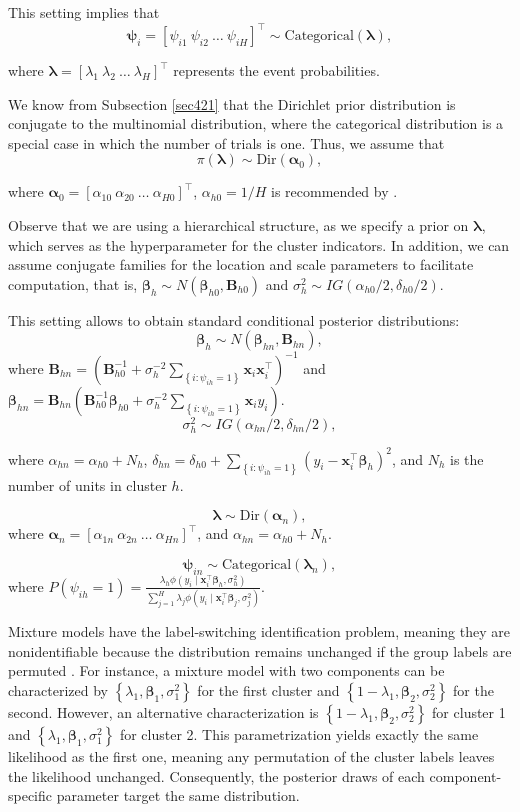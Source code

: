This setting implies that  
\[
\bm{\psi}_i = [\psi_{i1} \  \psi_{i2} \ \dots \ \psi_{iH}]^{\top} \sim \text{Categorical}(\bm{\lambda}),
\] 
  
where \( \bm{\lambda} = [\lambda_1 \  \lambda_2 \  \dots \ \lambda_H]^{\top} \) represents the event probabilities.

We know from Subsection \ref{sec421} that the Dirichlet prior distribution is conjugate to the multinomial distribution, where the categorical distribution is a special case in which the number of trials is one. Thus, we assume that  
\[
\pi(\bm{\lambda}) \sim \text{Dir}(\bm{\alpha}_0),
\]  

where \( \bm{\alpha}_0 = [\alpha_{10} \ \alpha_{20} \ \dots \ \alpha_{H0}]^{\top} \), $\alpha_{h0}=1/H$ is recommended by \cite[p.~535]{gelman2021bayesian}.  

Observe that we are using a hierarchical structure, as we specify a prior on \( \bm{\lambda} \), which serves as the hyperparameter for the cluster indicators. In addition, we can assume conjugate families for the location and scale parameters to facilitate computation, that is, $\bm \beta_h\sim N(\bm{\beta}_{h0},\bm{B}_{h0})$ and $\sigma_h^2\sim IG(\alpha_{h0}/2,\delta_{h0}/2)$.

This setting allows to obtain standard conditional posterior distributions: $$\bm{\beta}_{h}\sim N(\bm{\beta}_{hn},\bm{B}_{hn}),$$ where $\bm{B}_{hn}=(\bm{B}_{h0}^{-1}+\sigma_h^{-2}\sum_{\left\{i:  \psi_{ih}=1\right\}}\bm{x}_i\bm{x}_i^{\top})^{-1}$ and $\bm{\beta}_{hn}=\bm{B}_{hn}(\bm{B}_{h0}^{-1}\bm{\beta}_{h0}+\sigma_h^{-2}\sum_{\left\{i:  \psi_{ih}=1\right\}}\bm{x}_iy_i)$.
$$\sigma_h^2\sim IG(\alpha_{hn}/2,\delta_{hn}/2),$$

where $\alpha_{hn}=\alpha_{h0}+N_h$, $\delta_{hn}=\delta_{h0}+\sum_{\left\{i:  \psi_{ih}=1\right\}}(y_i-\bm{x}_i^{\top}\bm{\beta}_h)^2$, and $N_h$ is the number of units in cluster $h$.

$$\bm{\lambda}\sim \text{Dir}(\bm{\alpha}_n),$$   
where $\bm{\alpha}_n=[\alpha_{1n} \  \alpha_{2n} \ \dots \ \alpha_{Hn}]^{\top}$, and $\alpha_{hn}=\alpha_{h0}+N_h$.

$$\bm{\psi}_{in}\sim \text{Categorical}(\bm{\lambda}_n),$$
where $P(\psi_{ih}=1)=\frac{\lambda_{h}\phi(y_i \mid \bm{x}_i^{\top}\bm{\beta}_h,\sigma_h^2)}{\sum_{j=1}^H\lambda_{j}\phi(y_i \mid \bm{x}_i^{\top}\bm{\beta}_j,\sigma_j^2)}$.

Mixture models have the label-switching identification problem, meaning they are nonidentifiable because the distribution remains unchanged if the group labels are permuted \cite{van2011bayesian}. For instance, a mixture model with two components can be characterized by $\left\{\lambda_1,\bm{\beta}_1,\sigma_1^2\right\}$ for the first cluster and $\left\{1-\lambda_1,\bm{\beta}_2,\sigma_2^2\right\}$ for the second. However, an alternative characterization is $\left\{1-\lambda_1,\bm{\beta}_2,\sigma_2^2\right\}$ for cluster 1 and $\left\{\lambda_1,\bm{\beta}_1,\sigma_1^2\right\}$ for cluster 2. This parametrization yields exactly the same likelihood as the first one, meaning any permutation of the cluster labels leaves the likelihood unchanged. Consequently, the posterior draws of each component-specific parameter target the same distribution.

